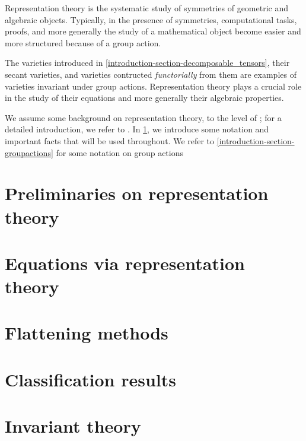 Representation theory is the systematic study of symmetries of geometric and algebraic objects. Typically, in the presence of symmetries, computational tasks, proofs, and more generally the study of a mathematical object become easier and more structured because of a group action.

The varieties introduced in \ref{introduction-section-decomposable_tensors}, their secant varieties, and varieties contructed \emph{functorially} from them are examples of varieties invariant under group actions. Representation theory plays a crucial role in the study of their equations and more generally their algebraic properties.

We assume some background on representation theory, to the level of \cite[Ch.6]{Lan12}; for a detailed introduction, we refer to \cite{FH91}. In \ref{reptheory-chapter-preliminaries}, we introduce some notation and important facts that will be used throughout. We refer to \ref{introduction-section-groupactions} for some notation on group actions

\chapter{Preliminaries on representation theory}
\label{reptheory-chapter-preliminaries}


\chapter{Equations via representation theory}
\label{RepTheory-chapter-equations}


\chapter{Flattening methods}
\label{RepTheory-chapter-flattenings}


\chapter{Classification results}
\label{RepTheory-chapter-classifications}


% 
\chapter{Invariant theory}
\label{RepTheory-chapter-invariantTheory}

